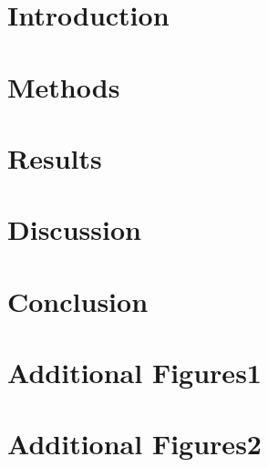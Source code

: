 \documentclass[twoside,openright]{styles/thesis}
\begin{document}
\frontmatter
\tableofcontents %

\mainmatter
\chapter{Introduction} %


\chapter{Methods}\label{chap:methods} %


\chapter{Results}


\chapter{Discussion}


\chapter{Conclusion}



\appendix
\chapter{Additional Figures1}
\chapter{Additional Figures2}


\backmatter


\printbibliography[title={参考文献}]



\end{document}
